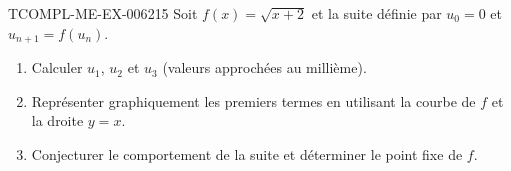 \begin{exercice}{TCOMPL-ME-EX-006}{2}{15}
Soit $f(x)=\sqrt{x+2}$ et la suite définie par $u_0=0$ et $u_{n+1}=f(u_n)$.
\begin{enumerate}
  \item Calculer $u_1$, $u_2$ et $u_3$ (valeurs approchées au millième).
  \item Représenter graphiquement les premiers termes en utilisant la courbe
        de $f$ et la droite $y=x$.
  \item Conjecturer le comportement de la suite et déterminer le point fixe
        de $f$.
\end{enumerate}
\end{exercice}
